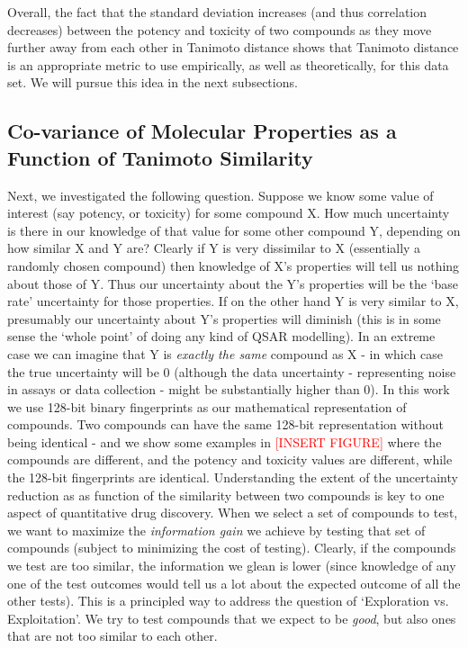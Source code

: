 \documentclass{article}
\begin{document}
Overall, the fact that the standard deviation increases (and thus correlation decreases) between the potency and toxicity of two compounds as they move further away from each other in Tanimoto distance shows that Tanimoto distance is an appropriate metric to use empirically, as well as theoretically, for this data set.  We will pursue this idea in the next subsections.  


\subsection{Co-variance of Molecular Properties as a Function of Tanimoto Similarity}

Next, we investigated the following question.  Suppose we know some value of interest (say potency, or toxicity) for some compound X.  How much uncertainty is there in our knowledge of that value for some other compound Y, depending on how similar X and Y are?
\newline
\newline
Clearly if Y is very dissimilar to X (essentially a randomly chosen compound) then knowledge of X's properties will tell us nothing about those of Y. Thus our uncertainty about the Y's properties will be the `base rate' uncertainty for those properties. If on the other hand Y is very similar to X, presumably our uncertainty about Y's properties will diminish (this is in some sense the `whole point' of doing any kind of QSAR modelling).  In an extreme case we can imagine that Y is \textit{exactly the same} compound as X - in which case the true uncertainty will be 0 (although the data uncertainty - representing noise in assays or data collection - might be substantially higher than 0).  In this work we use 128-bit binary fingerprints as our mathematical representation of compounds.  Two compounds can have the same 128-bit representation without being identical - and we show some examples in \textcolor{red}{[INSERT FIGURE]} where the compounds are different, and the potency and toxicity values are different, while the 128-bit fingerprints are identical.
\newline
\newline
Understanding the extent of the uncertainty reduction as as function of the similarity between two compounds is key to one aspect of quantitative drug discovery.  When we select a set of compounds to test, we want to maximize the \textit{information gain} we achieve by testing that set of compounds (subject to minimizing the cost of testing).  Clearly, if the compounds we test are too similar, the information we glean is lower (since knowledge of any one of the test outcomes would tell us a lot about the expected outcome of all the other tests).  This is a principled way to address the question of `Exploration vs. Exploitation'.  We try to test compounds that we expect to be \textit{good}, but also ones that are not too similar to each other.
\end{document}
